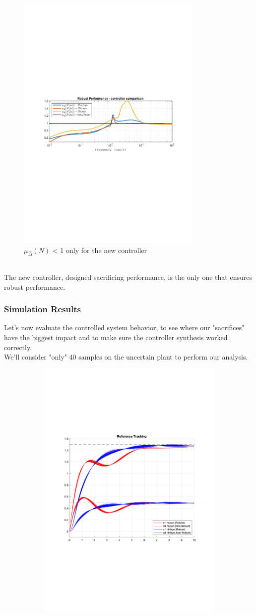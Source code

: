 \documentclass[a4paper, 12pt]{article}
\def\FigureThree{\centering\includegraphics[width=0.8\textwidth]{Figures/fig03.pdf}}
\begin{document}
\begin{figure}[h!]
    \FigureThree
    \caption{$\mu_{\hat{\Delta}}(N)$ < 1 only for the new controller}
    \label{fig:fig11}
\end{figure}
\\
The new controller, designed sacrificing performance, is the only one that ensures robust performance. \subsubsection{Simulation Results}
Let's now evaluate the controlled system behavior, to see where our "sacrifices" have the biggest impact and to make sure the controller synthesis worked correctly. \\
We'll consider "only" 40 samples on the uncertain plant to perform our analysis.
\begin{figure}[h!]{}
    \begin{subfigure}[t]{0.45\textwidth}
\includegraphics[width=\textwidth]{Figures/fig04a.pdf}

\end{subfigure}
\end{figure}
\end{document}
